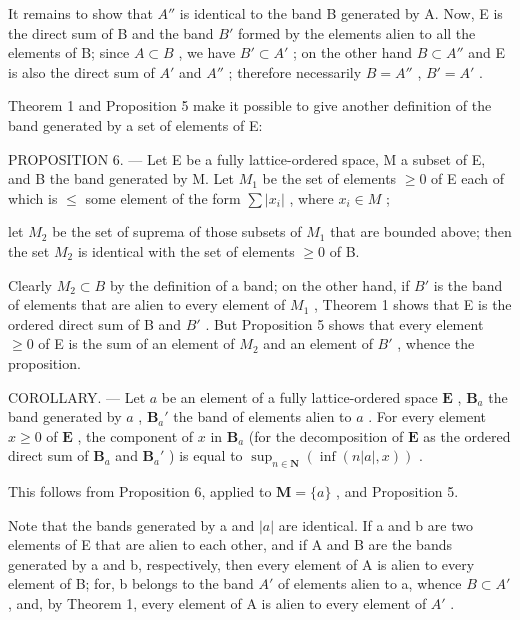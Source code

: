 It remains to show that \(A''\) is identical to the band B generated by A. Now, E is the direct sum of B and the band \(B'\) formed by the elements alien to all the elements of B; since \(A \subset B\) , we have \(B' \subset A'\) ; on the other hand \(B \subset A''\) and E is also the direct sum of \(A'\) and \(A''\) ; therefore necessarily \(B = A''\) , \(B' = A'\) .

Theorem 1 and Proposition 5 make it possible to give another definition of the band generated by a set of elements of E:

PROPOSITION 6. --- Let E be a fully lattice-ordered space, M a subset of E, and B the band generated by M. Let \(M_{1}\) be the set of elements \(\geqslant 0\) of E each of which is \(\leqslant\) some element of the form \(\sum |x_{i}|\) , where \(x_{i} \in M\) ;

let \(M_{2}\) be the set of suprema of those subsets of \(M_{1}\) that are bounded above; then the set \(M_{2}\) is identical with the set of elements \(\geqslant0\) of B.

Clearly \(M_{2} \subset B\) by the definition of a band; on the other hand, if \(B'\) is the band of elements that are alien to every element of \(M_{1}\) , Theorem 1 shows that E is the ordered direct sum of B and \(B'\) . But Proposition 5 shows that every element \(\geqslant 0\) of E is the sum of an element of \(M_{2}\) and an element of \(B'\) , whence the proposition.

COROLLARY. --- Let \(a\) be an element of a fully lattice-ordered space \(\mathbf{E}\) , \(\mathbf{B}_a\) the band generated by \(a\) , \(\mathbf{B}_a'\) the band of elements alien to \(a\) . For every element \(x \geqslant 0\) of \(\mathbf{E}\) , the component of \(x\) in \(\mathbf{B}_a\) (for the decomposition of \(\mathbf{E}\) as the ordered direct sum of \(\mathbf{B}_a\) and \(\mathbf{B}_a'\) ) is equal to \(\sup_{n \in \mathbf{N}} \left( \inf(n|a|, x) \right)\) .

This follows from Proposition 6, applied to \(\mathbf{M} = \{a\}\) , and Proposition 5.

Note that the bands generated by a and \(|a|\) are identical. If a and b are two elements of E that are alien to each other, and if A and B are the bands generated by a and b, respectively, then every element of A is alien to every element of B; for, b belongs to the band \(A'\) of elements alien to a, whence \(B \subset A'\) , and, by Theorem 1, every element of A is alien to every element of \(A'\) .

